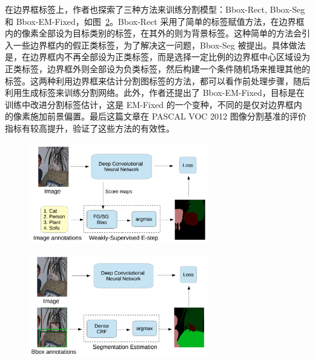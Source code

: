 在边界框标签上，作者也探索了三种方法来训练分割模型：Bbox-Rect, Bbox-Seg 和 Bbox-EM-Fixed，如图~\ref{c2_fig2}。Bbox-Rect 采用了简单的标签赋值方法，在边界框内的像素全部设为目标类别的标签，在其外的则为背景标签。这种简单的方法会引入一些边界框内的假正类标签，为了解决这一问题，Bbox-Seg 被提出。具体做法是，在边界框内不再全部设为正类标签，而是选择一定比例的边界框中心区域设为正类标签，边界框外则全部设为负类标签，然后构建一个条件随机场来推理其他的标签。这两种利用边界框来估计分割图标签的方法，都可以看作前处理步骤，随后利用生成标签来训练分割网络。此外，作者还提出了 Bbox-EM-Fixed，目标是在训练中改进分割标签估计，这是 EM-Fixed 的一个变种，不同的是仅对边界框内的像素施加前景偏置。最后这篇文章在 PASCAL VOC 2012 图像分割基准的评价指标有较高提升，验证了这些方法的有效性。


    \begin{figure}[tbp]
        \centering 
        \includegraphics[width=0.7\textwidth]{img/c2/rel_a1.png}
        \label{c2_fig1}
    \end{figure}

    \begin{figure}[tbp]
        \centering 
        \includegraphics[width=0.7\textwidth]{img/c2/rel_a2.png}
        \label{c2_fig2}
    \end{figure}

